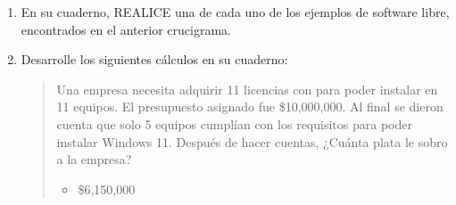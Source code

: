 \documentclass[letterpaper,10pt,spanish]{sphinxmanual}
\let\sphinxpxdimen\pdfpxdimen\else\newdimen\sphinxpxdimen
\begin{document}
\begin{enumerate}
\begin{savenotes}
\begin{tabulary}{\linewidth}[t]{T}
\begin{sphinxfigure-in-table}
\centering
\capstart
\noindent\sphinxincludegraphics[width=500\sphinxpxdimen]{{image20}.png}
\label{\detokenize{1_guias/10ofimatica/G1012:id59}}\end{sphinxfigure-in-table}\relax
\\
\sphinxhline
\sphinxAtStartPar
{} Mismas funcionalidades de Microsoft Office pero es software libre.
\\
\sphinxhline
\sphinxAtStartPar
{} No requiere Codecs para funcionar.
\\
\sphinxhline
\sphinxAtStartPar
{} Este sistema fue creado inicialmente por Linus Torvalds.
\\
\sphinxhline
\sphinxAtStartPar
{} Es una alternativa libre al navegador Google CHROME.
\\
\sphinxhline
\sphinxAtStartPar
{} Mismas funcionalidades de Photoshop pero es software libre.
\\
\sphinxhline
\sphinxAtStartPar
{} Se usa para crear logotipos.
\\
\sphinxbottomrule
\end{tabulary}
\sphinxtableafterendhook\par
\sphinxattableend\end{savenotes}

\item {} 
\sphinxAtStartPar
En su cuaderno, REALICE una  de cada uno de los ejemplos de software libre, encontrados en el anterior crucigrama.

\item {} 
\sphinxAtStartPar
Desarrolle los siguientes cálculos en su cuaderno:
\begin{quote}

\sphinxAtStartPar
Una empresa necesita adquirir 11 licencias con  para poder instalar en 11 equipos. El presupuesto asignado fue \$10,000,000. Al final se dieron cuenta que solo 5 equipos cumplían con los requisitos para poder instalar Windows 11. Después de hacer cuentas, ¿Cuánta plata le sobro a la empresa?
\begin{itemize}
\item {} 
\sphinxAtStartPar
{} \$6,150,000

\end{itemize}
\end{quote}
\begin{quote}


\end{quote}
\end{enumerate}
\end{document}
